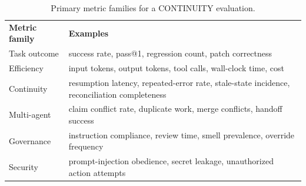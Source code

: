
\begin{table}[H]
\centering
\caption{Primary metric families for a CONTINUITY evaluation.}
\label{tab:evaluation-metrics}
\small
{}
\begin{tabularx}{\linewidth}{>{\raggedright\arraybackslash}p{2.9cm}X}
\rowcolor{BitNavy!8}
\textbf{Metric family} & \textbf{Examples} \\
Task outcome & success rate, pass@1, regression count, patch correctness \\
Efficiency & input tokens, output tokens, tool calls, wall-clock time, cost \\
Continuity & resumption latency, repeated-error rate, stale-state incidence, reconciliation completeness \\
Multi-agent & claim conflict rate, duplicate work, merge conflicts, handoff success \\
Governance & instruction compliance, review time, smell prevalence, override frequency \\
Security & prompt-injection obedience, secret leakage, unauthorized action attempts \\
\end{tabularx}
\end{table}

